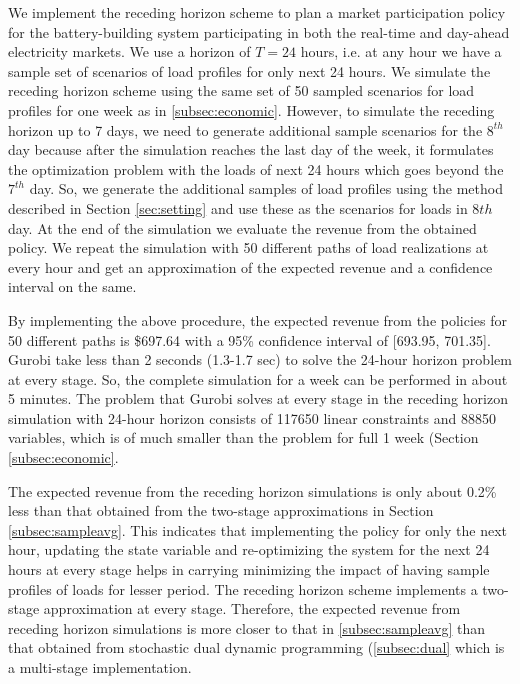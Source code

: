 \documentclass[11pt,twoside]{article}
\begin{document}
We implement the receding horizon scheme to plan a market participation policy for the battery-building system participating in both the real-time and day-ahead electricity markets. We use a horizon of $T=24$ hours, i.e. at any hour we have a sample set of scenarios of load profiles for only next 24 hours. We simulate the receding horizon scheme using the same set of 50 sampled scenarios for load profiles for one week as in \ref{subsec:economic}. However, to simulate the receding horizon up to 7 days, we need to generate additional sample scenarios for the $8^{th}$ day because after the simulation reaches the last day of the week, it formulates the optimization problem with the loads of next 24 hours which goes beyond the $7^{th}$ day. So, we generate the additional samples of load profiles using the method described in Section \ref{sec:setting} and use these as the scenarios for loads in $8{th}$ day. At the end of the simulation we evaluate the revenue from the obtained policy. We repeat the simulation with 50 different paths of load realizations at every hour and get an approximation of the expected revenue and a confidence interval on the same.

By implementing the above procedure, the expected revenue from the policies for 50 different paths is \$697.64 with a 95\% confidence interval of [693.95, 701.35]. 
Gurobi take less than 2 seconds (1.3-1.7 sec) to solve the 24-hour horizon problem at every stage. So, the complete simulation for a week can be performed in about 5 minutes. The problem that Gurobi solves at every stage in the receding horizon simulation with 24-hour horizon consists of 117650 linear constraints and 88850 variables, which is of much smaller than the problem for full 1 week (Section \ref{subsec:economic}.

The expected revenue from the receding horizon simulations is only about 0.2\% less than that obtained from the two-stage approximations in Section \ref{subsec:sampleavg}. This indicates that implementing the policy for only the next hour, updating the state variable and re-optimizing the system for the next 24 hours at every stage helps in carrying minimizing the impact of having sample profiles of loads for lesser period. The receding horizon scheme implements a two-stage approximation at every stage. Therefore, the expected revenue from receding horizon simulations is more closer to that in \ref{subsec:sampleavg} than that obtained from stochastic dual dynamic programming (\ref{subsec:dual} which is a multi-stage implementation.
\end{document}
